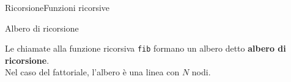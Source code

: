 \documentclass{beamer}
\begin{document}
\begin{frame}{Ricorsione}{Funzioni ricorsive}
\end{frame}

\begin{frame}{Albero di ricorsione}{}
    \begin{block}{}
        Le chiamate alla funzione ricorsiva \texttt{fib} formano un albero detto \textbf{albero di ricorsione}. \\
        Nel caso del fattoriale, l'albero \`e una linea con $N$ nodi.
    \end{block}
    \pause
    \vfill
    \vfill
\end{frame}
\end{document}
